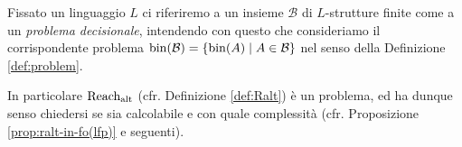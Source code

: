 \begin{definizione}
Fissato un linguaggio $L$ ci riferiremo a un insieme $\mathcal{B}$ di $L$-strutture finite
come a un \emph{problema decisionale}, intendendo con questo che consideriamo il corrispondente
problema $\operatorname{bin}(\mathcal{B}) = \{\operatorname{bin}(A) \mid A \in \mathcal{B}\}$ nel senso della Definizione \ref{def:problem}.
\end{definizione}
In particolare $\operatorname{Reach_{alt}}$ (cfr. Definizione \ref{def:Ralt}) è un problema, ed ha
dunque senso chiedersi se sia calcolabile e con quale complessità
(cfr. Proposizione \ref{prop:ralt-in-fo(lfp)} e seguenti).